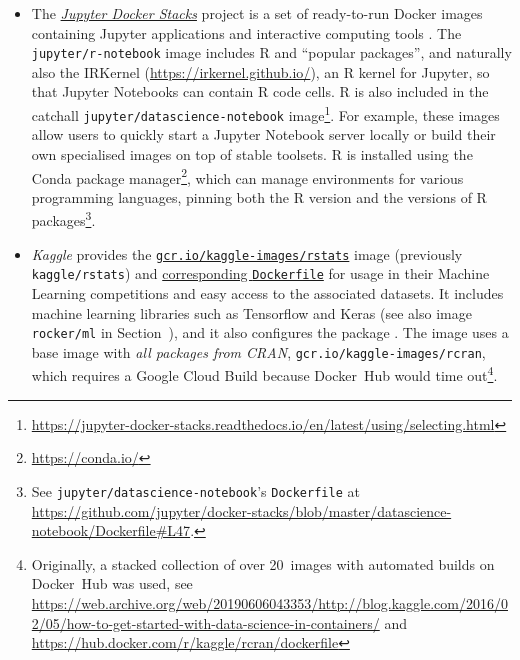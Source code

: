 \begin{itemize}
\tightlist
\item
  The \href{https://github.com/jupyter/docker-stacks/}{\emph{Jupyter
  Docker Stacks}} project is a set of ready-to-run Docker images
  containing Jupyter applications and interactive computing tools
  \citep{project_jupyter_jupyter_2018}. The \texttt{jupyter/r-notebook}
  image includes R and ``popular packages'', and naturally also the
  IRKernel (\url{https://irkernel.github.io/}), an R kernel for Jupyter,
  so that Jupyter Notebooks can contain R code cells. R is also included
  in the catchall \texttt{jupyter/datascience-notebook}
  image\footnote{\href{https://jupyter-docker-stacks.readthedocs.io/en/latest/using/selecting.html}{https://jupyter-docker-stacks.readthedocs.io/en/latest/using/selecting.html}}.
  For example, these images allow users to quickly start a Jupyter
  Notebook server locally or build their own specialised images on top
  of stable toolsets. R is installed using the Conda package
  manager\footnote{\href{https://conda.io/}{https://conda.io/}}, which
  can manage environments for various programming languages, pinning
  both the R version and the versions of R
  packages\footnote{See \texttt{jupyter/datascience-notebook}'s \texttt{Dockerfile} at \href{https://github.com/jupyter/docker-stacks/blob/master/datascience-notebook/Dockerfile\#L47}{https://github.com/jupyter/docker-stacks/blob/master/datascience-notebook/Dockerfile\#L47}.}.
\item
  \emph{Kaggle} provides the
  \href{https://hub.docker.com/r/kaggle/rstats}{\texttt{gcr.io/kaggle-images/rstats}}
  image (previously \texttt{kaggle/rstats}) and
  \href{https://github.com/Kaggle/docker-rstats}{corresponding
  \texttt{Dockerfile}} for usage in their Machine Learning competitions
  and easy access to the associated datasets. It includes machine
  learning libraries such as Tensorflow and Keras (see also image
  \texttt{rocker/ml} in Section~), and it also
  configures the  package \citep{cran_reticulate}.
  The image uses a base image with \emph{all packages from CRAN},
  \texttt{gcr.io/kaggle-images/rcran}, which requires a Google Cloud
  Build because Docker~Hub would time
  out\footnote{Originally, a stacked collection of over 20~images with automated builds on Docker~Hub was used, see \href{https://web.archive.org/web/20190606043353/http://blog.kaggle.com/2016/02/05/how-to-get-started-with-data-science-in-containers/}{https://web.archive.org/web/20190606043353/http://blog.kaggle.com/2016/02/05/how-to-get-started-with-data-science-in-containers/} and \href{https://hub.docker.com/r/kaggle/rcran/dockerfile}{https://hub.docker.com/r/kaggle/rcran/dockerfile}}.

\end{itemize}
